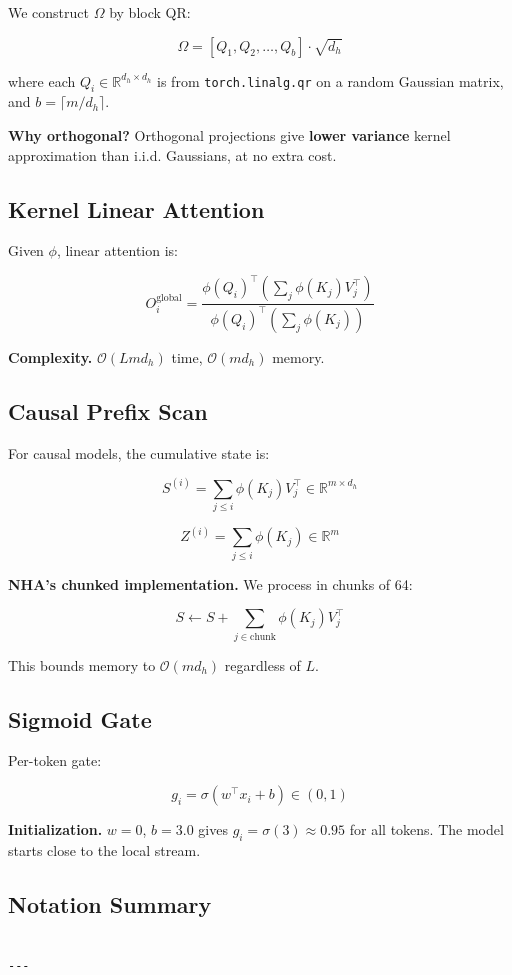 We construct $\Omega$ by block QR:

\[
\Omega = [Q_1, Q_2, \ldots, Q_b] \cdot \sqrt{d_h}
\tag{3.5}
\]

where each $Q_i \in \mathbb{R}^{d_h \times d_h}$ is from \texttt{torch.linalg.qr} 
on a random Gaussian matrix, and $b = \lceil m / d_h \rceil$.

\textbf{Why orthogonal?} Orthogonal projections give \textbf{lower variance} kernel 
approximation than i.i.d. Gaussians, at no extra cost.

\subsection{Kernel Linear Attention}

Given $\phi$, linear attention is:

\[
O_i^\text{global} = \frac{\phi(Q_i)^\top \left(\sum_j \phi(K_j) V_j^\top\right)}{\phi(Q_i)^\top \left(\sum_j \phi(K_j)\right)}
\tag{3.6}
\]

\textbf{Complexity.} $\mathcal{O}(L m d_h)$ time, $\mathcal{O}(m d_h)$ memory.

\subsection{Causal Prefix Scan}

For causal models, the cumulative state is:

\[
S^{(i)} = \sum_{j \leq i} \phi(K_j) V_j^\top \in \mathbb{R}^{m \times d_h}
\tag{3.7}
\]

\[
Z^{(i)} = \sum_{j \leq i} \phi(K_j) \in \mathbb{R}^m
\tag{3.8}
\]

\textbf{NHA's chunked implementation.} We process in chunks of 64:

\[
S \leftarrow S + \sum_{j \in \text{chunk}} \phi(K_j) V_j^\top
\tag{3.9}
\]

This bounds memory to $\mathcal{O}(m d_h)$ regardless of $L$.

\subsection{Sigmoid Gate}

Per-token gate:

\[
g_i = \sigma(w^\top x_i + b) \in (0, 1)
\tag{3.10}
\]

\textbf{Initialization.} $w = 0$, $b = 3.0$ gives $g_i = \sigma(3) \approx 0.95$ 
for all tokens. The model starts close to the local stream.

\subsection{Notation Summary}

\begin{lstlisting}

---
\end{lstlisting}